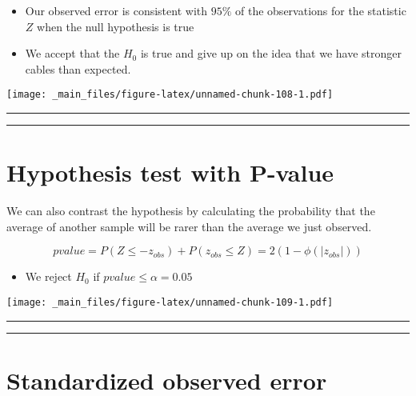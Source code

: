 \documentclass[
]{book}
\providecommand{\tightlist}{%
  \setlength{\itemsep}{0pt}\setlength{\parskip}{0pt}}
\begin{document}
\begin{itemize}
\item
  Our observed error is consistent with \(95\%\) of the observations for the statistic \(Z\) when the null hypothesis is true
\item
  We accept that the \(H_0\) is true and give up on the idea that we have stronger cables than expected.
\end{itemize}

\texttt{[image: \_main\_files/figure-latex/unnamed-chunk-108-1.pdf]}

\begin{center}\rule{0.5\linewidth}{0.5pt}\end{center}

\begin{center}\rule{0.5\linewidth}{0.5pt}\end{center}

\hypertarget{hypothesis-test-with-p-value}{%
\section{Hypothesis test with P-value}\label{hypothesis-test-with-p-value}}

We can also contrast the hypothesis by calculating the probability that the average of another sample will be rarer than the average we just observed.

\[pvalue = P(Z \leq -z_{obs}) + P(z_{obs} \leq Z) = 2 (1-\phi(|z_{obs}|))\]

\begin{itemize}
\tightlist
\item
  We reject \(H_0\) if \(pvalue \leq \alpha =0.05\)
\end{itemize}

\texttt{[image: \_main\_files/figure-latex/unnamed-chunk-109-1.pdf]}

\begin{center}\rule{0.5\linewidth}{0.5pt}\end{center}

\begin{center}\rule{0.5\linewidth}{0.5pt}\end{center}

\hypertarget{standardized-observed-error-1}{%
\section{Standardized observed error}\label{standardized-observed-error-1}}
\end{document}
